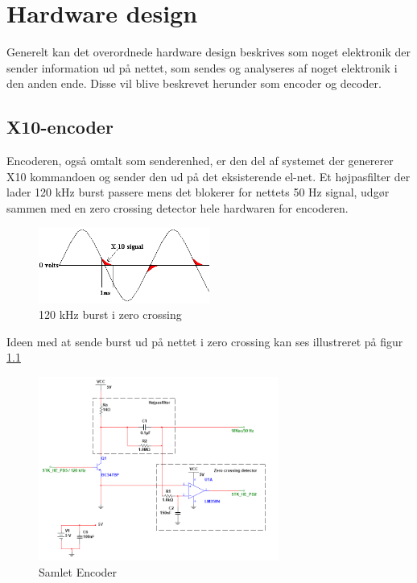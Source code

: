 \chapter{Hardware design}
Generelt kan det overordnede hardware design beskrives som noget elektronik der sender information ud på nettet, som sendes og analyseres af noget elektronik i den anden ende. Disse vil blive beskrevet herunder som encoder og decoder.  


\section{X10-encoder}
Encoderen, også omtalt som senderenhed, er den del af systemet der genererer X10 kommandoen og sender den ud på det eksisterende el-net. Et højpasfilter der lader 120 kHz burst passere mens det blokerer for nettets 50 Hz signal, udgør sammen med en zero crossing detector hele hardwaren for encoderen.

\begin{figure}[htbp]
	\centering
	\includegraphics[width=0.50\textwidth]{billeder/HWdesign/X10_BURST}
	\caption{120 kHz burst i zero crossing}
	\label{fig:X10_BURST}
\end{figure}

Ideen med at sende burst ud på nettet i zero crossing kan ses illustreret på figur \ref{fig:X10_BURST}

\begin{figure}[htbp]
	\centering
	\includegraphics[width=0.70\textwidth]{billeder/HWdesign/Encoder}
	\caption{Samlet Encoder}
	\label{fig:Encoder}
\end{figure}
\newpage

